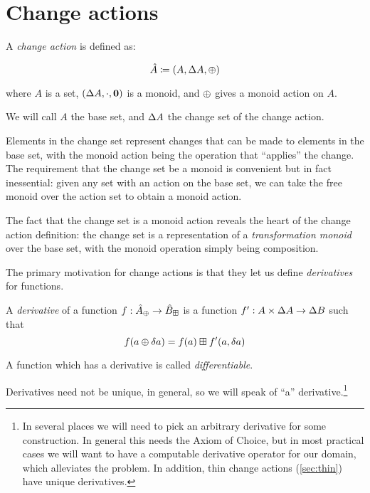 \section{Change actions}
\label{sec:changeActions}

\begin{defn}
  A \textit{change action} is defined as:

  $$\hat{A} \coloneqq (A,\Delta A,\oplus)$$

  where $A$ is a set, $(\Delta A, \cdot, \textbf{0})$ is a monoid, and $\oplus$ gives a monoid action on $A$.

  We will call $A$ the base set, and $\Delta A$ the change set of the change action.
\end{defn}

Elements in the change set represent changes that can be made to elements in the
base set, with the monoid action being the operation that ``applies'' the
change. The requirement that the change set be a monoid is convenient but in
fact inessential: given any set with an action on the base set, we can take the
free monoid over the action set to obtain a monoid action.

The fact that the change set is a monoid action reveals the heart of the
change action definition: the change set is a representation of a
\textit{transformation monoid} over the base set, with the monoid
operation simply being composition.

The primary motivation for change actions is that they let us define
\textit{derivatives} for functions.

\begin{defn}[Derivatives]
  A \textit{derivative} of a function $f: \hat{A}_\oplus \rightarrow \hat{B}_\boxplus$ is a function $f': A \times \Delta A \rightarrow
  \Delta B$ such that
  $$f(a \oplus \delta a) = f(a) \boxplus f'(a, \delta a)$$

  A function which has a derivative is called \textit{differentiable}.
\end{defn}

Derivatives need not be unique, in general, so we will speak of ``a''
derivative.\footnote{In several places we will need to pick an arbitrary
  derivative for some construction. In general this needs the Axiom of Choice,
  but in most practical cases we will want to have a computable derivative
  operator for our domain, which alleviates the problem. In addition, thin
  change actions (\cref{sec:thin}) have unique derivatives.}

